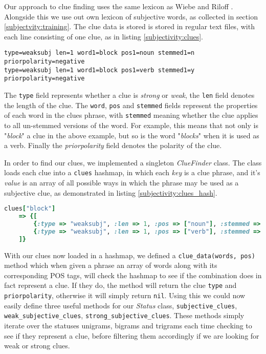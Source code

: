 Our approach to clue finding uses the same lexicon as Wiebe and Riloff \cite{Wiebe:2000ub}. Alongside this we use out own lexicon of subjective words, as collected in section \ref{subjectvity:training}. The clue data is stored is stored in regular text files, with each line consisting of one clue, as in listing \ref{subjectivity:clues}.

\begin{lstlisting}[numbers=none, caption={Example clue from the subjective clue lexicon}, label=subjectivity:clues]
type=weaksubj len=1 word1=block pos1=noun stemmed1=n priorpolarity=negative
type=weaksubj len=1 word1=block pos1=verb stemmed1=y priorpolarity=negative
\end{lstlisting}

The \texttt{type} field represents whether a clue is \emph{strong} or \emph{weak}, the \texttt{len} field denotes the length of the clue. The \texttt{word}, \texttt{pos} and \texttt{stemmed} fields represent the properties of each word in the clues phrase, with \texttt{stemmed} meaning whether the clue applies to all un-stemmed versions of the word. For example, this means that not only is "\emph{block}" a clue in the above example, but so is the word "\emph{blocks}" when it is used as a verb. Finally the \emph{priorpolarity} field denotes the polarity of the clue.

In order to find our clues, we implemented a singleton \emph{ClueFinder} class. The class loads each clue into a \texttt{clues} hashmap, in which each \emph{key} is a clue phrase, and it's \emph{value} is an array of all possible ways in which the phrase may be used as a subjective clue, as demonstrated in listing \ref{subjectivity:clues_hash}.

\begin{lstlisting}[language=Ruby, caption={Ruby hashmap representation of listing \ref{subjectivity:clues}}, label=subjectivity:clues_hash]
clues["block"]
	=> {[
		{:type => "weaksubj", :len => 1, :pos => ["noun"], :stemmed => ["n"], :priorpolarity => "negative"},
		{:type => "weaksubj", :len => 1, :pos => ["verb"], :stemmed => ["y"], :priorpolarity => "negative"}
	]}
\end{lstlisting}

With our clues now loaded in a hashmap, we defined a \texttt{clue\-\_data(words, pos)} method which when given a phrase an array of words along with its corresponding POS tags, will check the hashmap to see if the combination does in fact represent a clue. If they do, the method will return the clue \texttt{type} and \texttt{priorpolarity}, otherwise it will simply return \texttt{nil}. Using this we could now easily define three useful methods for our \emph{Status} class, \texttt{subjective\-\_clues}, \texttt{weak\-\_subjective\-\_clues}, \texttt{strong\-\_subjective\-\_clues}. These methods simply iterate over the statuses unigrams, bigrams and trigrams each time checking to see if they represent a clue, before filtering them accordingly if we are looking for weak or strong clues.


